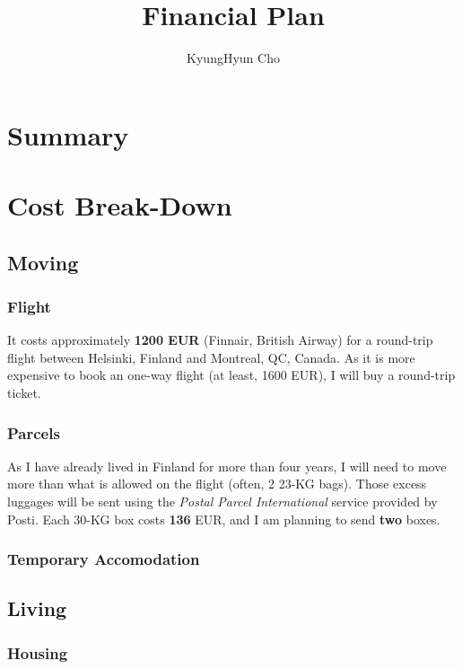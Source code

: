 \documentclass[11pt, oneside]{essay}
\title{Financial Plan}
\author{KyungHyun Cho}
\begin{document}
\maketitle

\section{Summary}



\section{Cost Break-Down}


\subsection{Moving}

\subsubsection{Flight}

It costs approximately \textbf{1200 EUR} (Finnair, British
Airway) for a round-trip flight between Helsinki, Finland
and Montreal, QC, Canada. As it is more expensive to book an
one-way flight (at least, 1600 EUR), I will buy a round-trip
ticket.

\subsubsection{Parcels}

As I have already lived in Finland for more than four years,
I will need to move more than what is allowed on the flight
(often, 2 23-KG bags). Those excess luggages will be sent using
the \textit{Postal Parcel International} service provided by
Posti. Each 30-KG box costs \textbf{136} EUR, and I am planning
to send \textbf{two} boxes.

\subsubsection{Temporary Accomodation}




\subsection{Living}

\subsubsection{Housing}
\end{document}

